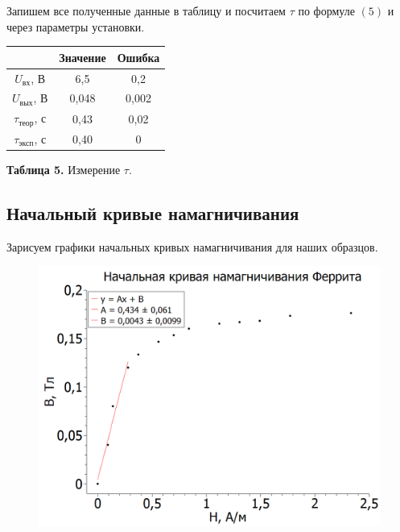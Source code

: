 \documentclass[a4paper, 12pt]{article}%
\begin{document}
Запишем все полученные данные в таблицу и посчитаем $\tau$ по формуле $(5)$ и через параметры установки.

\begin{center}
\begin{tabular}{|c|c|c|}
\hline 
 & Значение & Ошибка \\ 
\hline 
$U_{\text{вх}}$, В & 6,5 & 0,2 \\ 
\hline 
$U_{\text{вых}}$, В & 0,048 & 0,002 \\ 
\hline 
$\tau_{\text{теор}}$, с & 0,43 & 0,02 \\ 
\hline 
$\tau_{\text{эксп}}$, с & 0,40 & 0 \\ 
\hline 
\end{tabular} 

\textbf{Таблица 5.} Измерение $\tau$.
\end{center}

\subsection*{Начальный кривые намагничивания}

Зарисуем графики начальных кривых намагничивания для наших образцов.

\begin{figure}[h!]
\centering
\includegraphics[scale=0.5]{Феррит.png}
\label{fig:Image1}
\end{figure}
\end{document}
